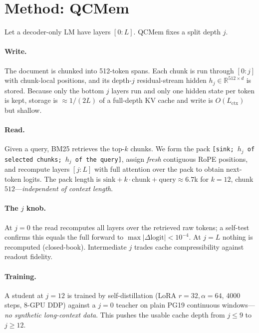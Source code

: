\section{Method: QCMem}
\label{sec:method}
Let a decoder-only LM have layers $[0{:}L]$. QCMem fixes a split depth $j$.

\paragraph{Write.} The document is chunked into 512-token spans. Each chunk is
run through $[0{:}j]$ with chunk-local positions, and its depth-$j$
residual-stream hidden $h_j\in\mathbb{R}^{512\times d}$ is stored. Because only
the bottom $j$ layers run and only one hidden state per token is kept, storage
is $\approx$$1/(2L)$ of a full-depth KV cache and write is $O(L_{\text{ctx}})$
but shallow.

\paragraph{Read.} Given a query, BM25 retrieves the top-$k$ chunks. We form the
pack \texttt{[sink; $h_j$ of selected chunks; $h_j$ of the query]}, assign
\emph{fresh} contiguous RoPE positions, and recompute layers $[j{:}L]$ with
full attention over the pack to obtain next-token logits. The pack length is
$\text{sink}+k\cdot\text{chunk}+\text{query}\approx6.7$k for $k{=}12$,
chunk $512$---\emph{independent of context length}.

\paragraph{The $j$ knob.} At $j{=}0$ the read recomputes all layers over the
retrieved raw tokens; a self-test confirms this equals the full forward to
$\max|\Delta\text{logit}|<10^{-4}$. At $j{=}L$ nothing is recomputed
(closed-book). Intermediate $j$ trades cache compressibility against readout
fidelity.

\paragraph{Training.} A student at $j{=}12$ is trained by self-distillation
(LoRA $r{=}32,\alpha{=}64$, 4000 steps, 8-GPU DDP) against a $j{=}0$ teacher on
plain PG19 continuous windows---\emph{no synthetic long-context data}. This
pushes the usable cache depth from $j{\le}9$ to $j{\ge}12$.
